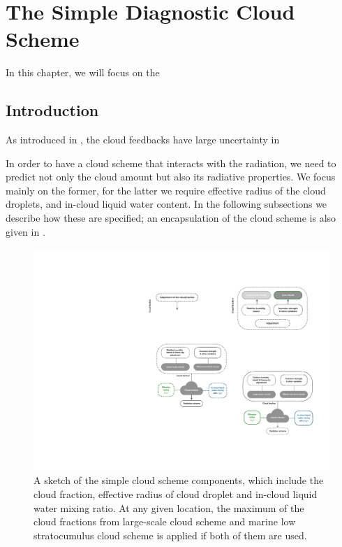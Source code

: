 \chapter{The Simple Diagnostic Cloud Scheme}
\label{chp:simple_cld_scheme}

In this chapter, we will focus on the 

\section{Introduction}

As introduced in , the cloud feedbacks have large uncertainty in

In order to have a cloud scheme that interacts with the radiation, we need to predict not only the cloud amount but also its radiative properties. We focus mainly on the former, for the latter we require effective radius of the cloud droplets, and in-cloud liquid water content. In the following subsections we describe how these are specified; an encapsulation of the cloud scheme is also given in . 

\begin{figure}[t]
	\centering
	\includegraphics[width=0.7\linewidth]{figs/simple_cld_scheme/diag_cld_scheme_summary.pdf}
	\caption{A sketch of the simple cloud scheme components, which include the cloud fraction, effective radius of cloud droplet and in-cloud liquid water mixing ratio. At any given location, the maximum of the cloud fractions from large-scale cloud scheme and marine low stratocumulus cloud scheme is applied if both of them are used.} 
	\label{fig:cld_scheme_summary}
\end{figure}

